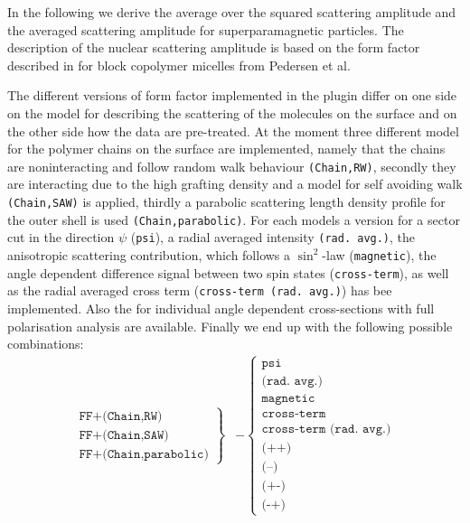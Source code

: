 In the following we derive the average over the squared scattering
amplitude and the averaged scattering amplitude for
superparamagnetic particles. The description of the nuclear
scattering amplitude is based on the form factor described in
\cite{PedersenGerstenberg96,PedersenJApplCryst2000} for block
copolymer micelles from Pedersen et al.

The different versions of form factor implemented in the plugin
differ on one side on the model for describing the scattering of the
molecules on the surface and on the other side how the data are
pre-treated. At the moment three different model for the polymer
chains on the surface are implemented, namely that the chains are
noninteracting and follow random walk behaviour \texttt{(Chain,RW)},
secondly they are interacting due to the high grafting density and a
model for self avoiding walk \texttt{(Chain,SAW)} is applied,
thirdly a parabolic scattering length density profile for the outer
shell is used \texttt{(Chain,parabolic)}. For each models a version
for a sector cut in the direction $\psi$ (\texttt{psi}), a radial
averaged intensity \texttt{(rad.~avg.)}, the anisotropic scattering
contribution, which follows a $\sin^2$-law (\texttt{magnetic}), the
angle dependent difference signal between two spin states
(\texttt{cross-term}), as well as the radial averaged cross term
(\texttt{cross-term (rad.~avg.)}) has bee implemented. Also the for
individual angle dependent cross-sections with full polarisation
analysis are available. Finally we end up with the following
possible combinations:
\begin{align}
\left.
  \begin{array}{l}
    \texttt{FF+(Chain,RW)} \\
    \texttt{FF+(Chain,SAW)} \\
    \texttt{FF+(Chain,parabolic)}
  \end{array}
\right\} &-  \left\{
  \begin{array}{l}
    \texttt{psi} \\
    \texttt{(rad.~avg.)} \\
    \texttt{magnetic} \\
    \texttt{cross-term} \\
    \texttt{cross-term (rad.~avg.)} \\
    \texttt{(++)} \\
    \texttt{(--)} \\
    \texttt{(+-)} \\
    \texttt{(-+)}
  \end{array}
\right.
\end{align}

